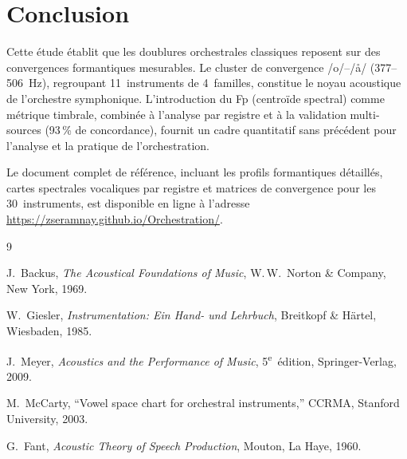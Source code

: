 \documentclass[11pt,a4paper]{article}
\begin{document}
\section{Conclusion}

Cette étude établit que les doublures orchestrales classiques reposent
sur des convergences formantiques mesurables. Le cluster de convergence
/o/--/\r{a}/ (377--\SI{506}{Hz}), regroupant 11~instruments de
4~familles, constitue le noyau acoustique de l'orchestre symphonique.
L'introduction du Fp (centroïde spectral) comme métrique timbrale,
combinée à l'analyse par registre et à la validation multi-sources
(93\,\% de concordance), fournit un cadre quantitatif sans précédent
pour l'analyse et la pratique de l'orchestration.

Le document complet de référence, incluant les profils formantiques
détaillés, cartes spectrales vocaliques par registre et matrices de
convergence pour les 30~instruments, est disponible en ligne à l'adresse
\url{https://zseramnay.github.io/Orchestration/}.


\begin{thebibliography}{9}

  J.~Backus,
  \textit{The Acoustical Foundations of Music},
  W.\,W.~Norton \& Company, New York, 1969.

  W.~Giesler,
  \textit{Instrumentation: Ein Hand- und Lehrbuch},
  Breitkopf \& Härtel, Wiesbaden, 1985.

  J.~Meyer,
  \textit{Acoustics and the Performance of Music},
  5\textsuperscript{e}~édition, Springer-Verlag, 2009.

  M.~McCarty,
  ``Vowel space chart for orchestral instruments,''
  CCRMA, Stanford University, 2003.

  G.~Fant,
  \textit{Acoustic Theory of Speech Production},
  Mouton, La Haye, 1960.

\end{thebibliography}
\end{document}
